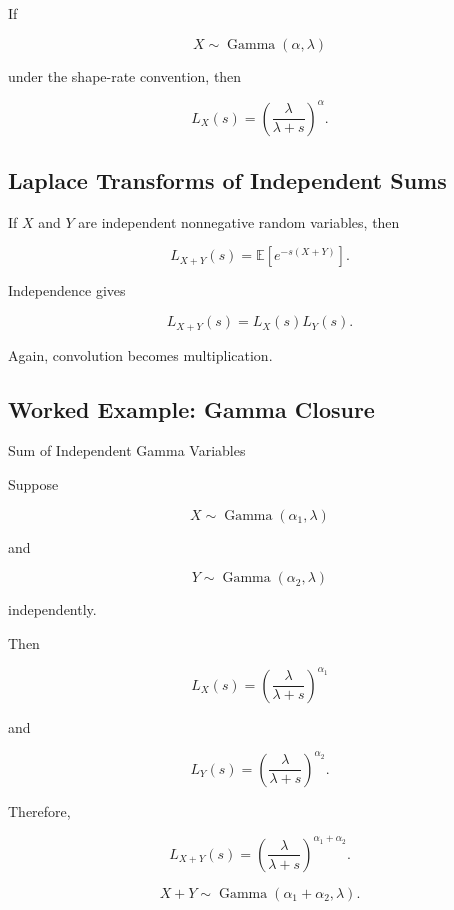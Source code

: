 If

\[
X\sim\operatorname{Gamma}(\alpha,\lambda)
\]

under the shape-rate convention, then

\[
\boxed{
L_X(s)
=
\left(
\frac{\lambda}{\lambda+s}
\right)^\alpha.
}
\]

\subsection{Laplace Transforms of Independent Sums}
\label{subsec:laplace-independent-sums}

If \(X\) and \(Y\) are independent nonnegative random variables, then

\[
L_{X+Y}(s)
=
\mathbb{E}[e^{-s(X+Y)}].
\]

Independence gives

\[
\boxed{
L_{X+Y}(s)
=
L_X(s)L_Y(s).
}
\]

Again, convolution becomes multiplication.

\subsection{Worked Example: Gamma Closure}
\label{subsec:worked-laplace-gamma-sum}

\begin{workedexamplebox}{Sum of Independent Gamma Variables}

Suppose

\[
X\sim\operatorname{Gamma}(\alpha_1,\lambda)
\]

and

\[
Y\sim\operatorname{Gamma}(\alpha_2,\lambda)
\]

independently.

Then

\[
L_X(s)
=
\left(
\frac{\lambda}{\lambda+s}
\right)^{\alpha_1}
\]

and

\[
L_Y(s)
=
\left(
\frac{\lambda}{\lambda+s}
\right)^{\alpha_2}.
\]

Therefore,

\[
L_{X+Y}(s)
=
\left(
\frac{\lambda}{\lambda+s}
\right)^{\alpha_1+\alpha_2}.
\]

\begin{answerbox}
\[
\boxed{
X+Y
\sim
\operatorname{Gamma}
(\alpha_1+\alpha_2,\lambda).
}
\]
\end{answerbox}

\end{workedexamplebox}

